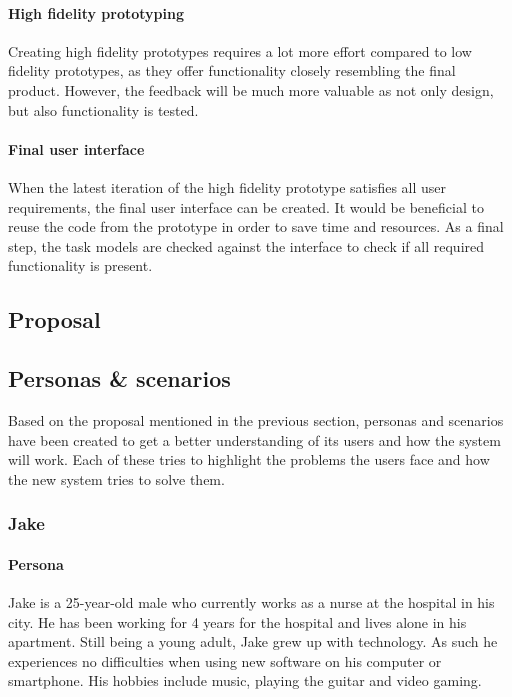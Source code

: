         \paragraph{High fidelity prototyping} Creating high fidelity prototypes requires a lot more effort compared to low fidelity prototypes, as they offer functionality closely resembling the final product. However, the feedback will be much more valuable as not only design, but also functionality is tested.

        \paragraph{Final user interface} When the latest iteration of the high fidelity prototype satisfies all user requirements, the final user interface can be created. It would be beneficial to reuse the code from the prototype in order to save time and resources. As a final step, the task models are checked against the interface to check if all required functionality is present.

    \subsection{Proposal}

    \subsection{Personas \& scenarios}

    Based on the proposal mentioned in the previous section, personas and scenarios have been created to get a better understanding of its users and how the system will work. Each of these tries to highlight the problems the users face and how the new system tries to solve them.

        \subsubsection{Jake}

        \paragraph{Persona} Jake is a 25-year-old male who currently works as a nurse at the hospital in his city. He has been working for 4 years for the hospital and lives alone in his apartment. Still being a young adult, Jake grew up with technology. As such he experiences no difficulties when using new software on his computer or smartphone. His hobbies include music, playing the guitar and video gaming.


